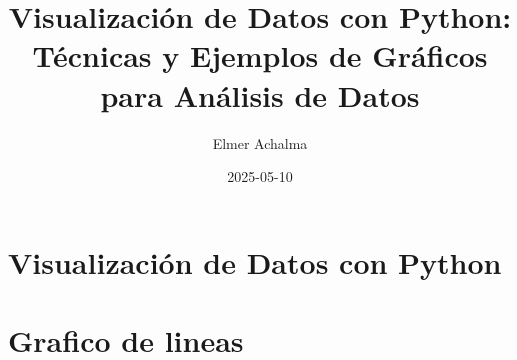 \documentclass[
  jou,
  floatsintext,
  longtable,
  a4paper,
  nolmodern,
  notxfonts,
  notimes,
  colorlinks=true,linkcolor=blue,citecolor=blue,urlcolor=blue]{apa7}
\title{Visualización de Datos con Python: Técnicas y Ejemplos de
Gráficos para Análisis de Datos}
\author{Elmer Achalma}
\affiliation{
{Economía, Universidad Nacional de San Cristóbal de Huamanga}}
\date{2025-05-10}
\begin{document}
\maketitle

\hypertarget{toc}{}
\tableofcontents
\newpage
\section[Introduction]{Visualización de Datos con Python}

\setcounter{secnumdepth}{-\maxdimen} %

\setlength\LTleft{0pt}


\section{Grafico de lineas}\label{grafico-de-lineas}
\end{document}
